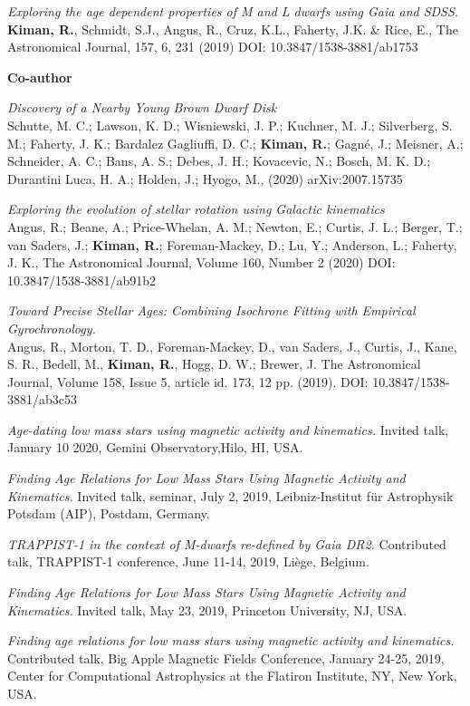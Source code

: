 \documentclass[10pt]{cv}
\begin{document}
\begin{llist}
\textit{Exploring the age dependent properties of M and L dwarfs using \textit{Gaia} and SDSS.}\\
\textbf{Kiman, R.}, Schmidt, S.J., Angus, R., Cruz, K.L., Faherty, J.K. \& Rice, E., The Astronomical Journal, 157, 6, 231 (2019) DOI: 10.3847/1538-3881/ab1753 


\textbf{Co-author}

\textit{Discovery of a Nearby Young Brown Dwarf Disk}\\
Schutte, M. C.; Lawson, K. D.; Wisniewski, J. P.; Kuchner, M. J.; Silverberg, S. M.; Faherty, J. K.; Bardalez Gagliuffi, D. C.; \textbf{Kiman, R.}; Gagné, J.; Meisner, A.; Schneider, A. C.; Bans, A. S.; Debes, J. H.; Kovacevic, N.; Bosch, M. K. D.; Durantini Luca, H. A.; Holden, J.; Hyogo, M., (2020) arXiv:2007.15735

\textit{Exploring the evolution of stellar rotation using Galactic kinematics}\\
Angus, R.; Beane, A.; Price-Whelan, A. M.; Newton, E.; Curtis, J. L.; Berger, T.; van Saders, J.; \textbf{Kiman, R.}; Foreman-Mackey, D.; Lu, Y.; Anderson, L.; Faherty, J. K., The Astronomical Journal, Volume 160, Number 2 (2020) DOI: 10.3847/1538-3881/ab91b2

\textit{Toward Precise Stellar Ages: Combining Isochrone Fitting with Empirical Gyrochronology.}\\ 
Angus, R., Morton, T. D., Foreman-Mackey, D., van Saders, J., Curtis, J., Kane, S. R., Bedell, M., \textbf{Kiman, R.}, Hogg, D. W.; Brewer, J. The Astronomical Journal, Volume 158, Issue 5, article id. 173, 12 pp. (2019). DOI: 10.3847/1538-3881/ab3c53


\textit{Age-dating low mass stars using magnetic activity and kinematics.} Invited talk, January 10 2020, Gemini Observatory,Hilo, HI, USA.

\textit{Finding Age Relations for Low Mass Stars Using Magnetic Activity and Kinematics.} Invited talk, seminar, July 2, 2019, Leibniz-Institut f\"{u}r Astrophysik Potsdam (AIP), Postdam, Germany.

\textit{TRAPPIST-1 in the context of M-dwarfs re-defined by Gaia DR2.} Contributed talk, TRAPPIST-1 conference, June 11-14, 2019, Li\`ege, Belgium.

\textit{Finding Age Relations for Low Mass Stars Using Magnetic Activity and Kinematics.} Invited talk, May 23, 2019, Princeton University, NJ, USA. 

\textit{Finding age relations for low mass stars using magnetic activity and kinematics.} Contributed talk, Big Apple Magnetic Fields Conference, January 24-25, 2019, Center for Computational Astrophysics at the Flatiron Institute, NY, New York, USA. 


\end{llist}
\end{document}
